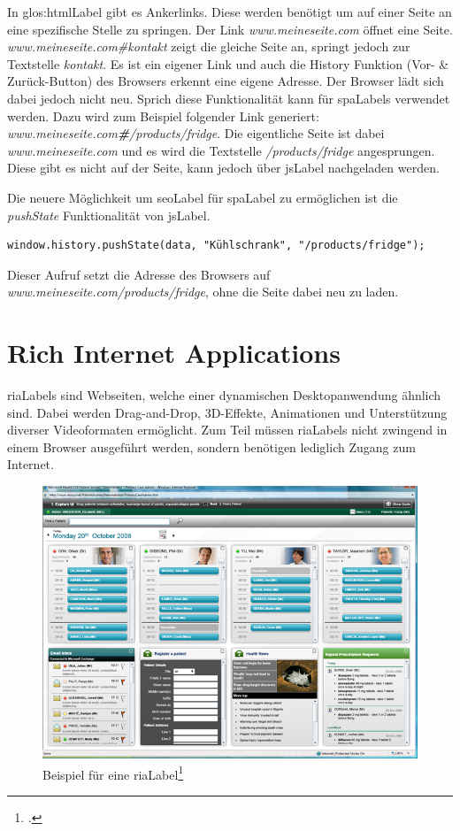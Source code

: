 In \Gls{glos:htmlLabel} gibt es Ankerlinks. Diese werden benötigt um auf einer Seite an eine spezifische Stelle zu springen. Der Link \textit{www.meineseite.com} öffnet eine Seite. \textit{www.meineseite.com\#kontakt} zeigt die gleiche Seite an, springt jedoch zur Textstelle \textit{kontakt}. Es ist ein eigener Link und auch die History Funktion (Vor- \& Zurück-Button) des Browsers erkennt eine eigene Adresse. Der Browser lädt sich dabei jedoch nicht neu. Sprich diese Funktionalität kann für \glspl{spaLabel} verwendet werden. Dazu wird zum Beispiel folgender Link generiert: \textit{www.meineseite.com\textbf{\#}/products/fridge}. Die eigentliche Seite ist dabei \textit{www.meineseite.com} und es wird die Textstelle \textit{/products/fridge} angesprungen. Diese gibt es nicht auf der Seite, kann jedoch über \gls{jsLabel} nachgeladen werden.

Die neuere Möglichkeit um \gls{seoLabel} für \gls{spaLabel} zu ermöglichen ist die \textit{pushState} Funktionalität von \gls{jsLabel}.

\begin{lstlisting}
window.history.pushState(data, "Kühlschrank", "/products/fridge");
\end{lstlisting}

Dieser Aufruf setzt die Adresse des Browsers auf \textit{www.meineseite.com/products/fridge}, ohne die Seite dabei neu zu laden.

\section{Rich Internet Applications}
\glspl{riaLabel} sind Webseiten, welche einer dynamischen Desktopanwendung ähnlich sind. Dabei werden Drag-and-Drop, 3D-Effekte, Animationen und Unterstützung diverser Videoformaten ermöglicht. Zum Teil müssen \glspl{riaLabel} nicht zwingend in einem Browser ausgeführt werden, sondern benötigen lediglich Zugang zum Internet.

\begin{figure}[H]
	\centering
	\includegraphics[width=.6\linewidth]{images/rich_internet_application.png}
	\caption{Beispiel für eine \gls{riaLabel}\footcite{AjaxWorld_Talk_Building_Rich_Internet_Applications_2015-06-07}}
	\label{fig:softwaredesign:richinternetapplication}
\end{figure}

